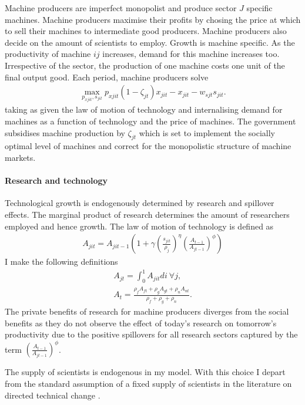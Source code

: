 Machine producers are imperfect monopolist and produce sector $J$ specific machines. Machine producers maximise their profits by chosing the price at which to sell their machines to intermediate good producers. Machine producers also decide on the amount of scientists to employ. Growth is machine specific. As the productivity of machine $ij$ increases, demand for this machine increases too. Irrespective of the sector, the production of one machine costs one unit of the final output good.
Each period, machine producers solve
\begin{align}
\underset{p_{xjit}, s_{jit}}{\max}p_{xjit}(1-\zeta_{jt})x_{jit}-x_{jit}-w_{sjt}s_{jit}.
\end{align}
taking as given the law of motion of technology and internalising demand for machines as a function of technology and the price of machines. 
The government subsidises machine production by $\zeta_{jt}$ which is set to implement the socially optimal level of machines and correct for the monopolistic structure of machine markets. 

\paragraph{Research and technology}
Technological growth is endogenously determined by research and spillover effects. The marginal product of research determines the amount of researchers employed and hence growth. 
The law of motion of technology is defined as
\begin{align}
A_{jit}=A_{jit-1}\left(1+\gamma\left(\frac{s_{jit}}{\rho_j}\right)^\eta\left(\frac{A_{t-1}}{A_{jt-1}}\right)^\phi\right)
\end{align}
I make the following definitions
\begin{align}
A_{jt}=\int_{0}^{1}A_{jit}di\ \forall j,\\
A_{t}=\frac{\rho_fA_{ft}+\rho_gA_{gt}+\rho_n A_{nt}}{\rho_f+\rho_g+\rho_n}.
\end{align}
The private benefits of research for machine producers diverges from the social benefits as they do not observe the effect of today's research on tomorrow's productivity due to the positive spillovers for all research sectors captured by the term $\left(\frac{A_{t-1}}{A_{jt-1}}\right)^\phi$. 

The supply of scientists is endogenous in my model. With this choice I depart from the standard assumption of a fixed supply of scientists in the literature on directed technical change \cite{Acemoglu2012TheChange, Fried2018ClimateAnalysis}. 

